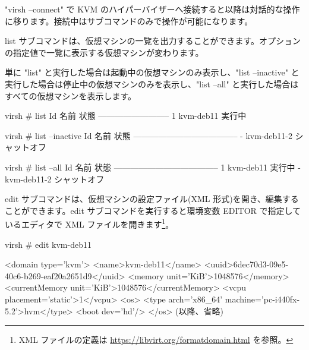 \documentclass[mingoth,a4paper]{jsarticle}
\begin{document}

"virsh --connect" で KVM のハイパーバイザーへ接続すると以降は対話的な操作に移ります。接続中はサブコマンドのみで操作が可能になります。



list サブコマンドは、仮想マシンの一覧を出力することができます。オプションの指定値で一覧に表示する仮想マシンが変わります。 

単に "list" と実行した場合は起動中の仮想マシンのみ表示し、"list --inactive" と実行した場合は停止中の仮想マシンのみを表示し、"list --all" と実行した場合はすべての仮想マシンを表示します。

\begin{commandline}
virsh # list
 Id   名前        状態
--------------------------
 1    kvm-deb11   実行中
\end{commandline}

\begin{commandline}
virsh # list --inactive
 Id   名前              状態
--------------------------------------
 -    kvm-deb11-2       シャットオフ

\end{commandline}

\begin{commandline}
virsh # list --all
 Id   名前              状態
--------------------------------------
 1    kvm-deb11         実行中
 -    kvm-deb11-2       シャットオフ
\end{commandline}



edit サブコマンドは、仮想マシンの設定ファイル(XML 形式)を開き、編集することができます。edit サブコマンドを実行すると環境変数 EDITOR で指定しているエディタで XML ファイルを開きます\footnote{XML ファイルの定義は \url{https://libvirt.org/formatdomain.html} を参照。}。

\begin{commandline}
virsh # edit kvm-deb11


<domain type='kvm'>
  <name>kvm-deb11</name>
  <uuid>6dec70d3-09e5-40c6-b269-eaf20a2651d9</uuid>
  <memory unit='KiB'>1048576</memory>
  <currentMemory unit='KiB'>1048576</currentMemory>
  <vcpu placement='static'>1</vcpu>
  <os>
    <type arch='x86_64' machine='pc-i440fx-5.2'>hvm</type>
    <boot dev='hd'/>
  </os>
  (以降、省略)
\end{commandline}
\end{document}
